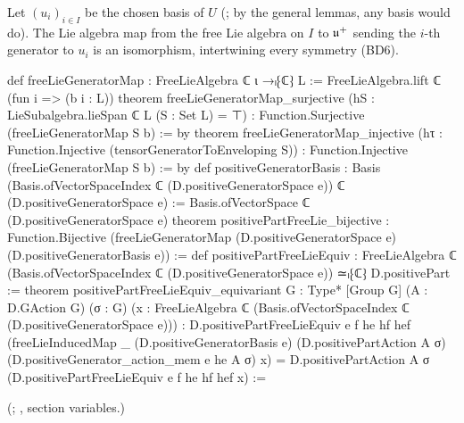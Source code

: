 \begin{theorem}\label{ch18:thm:freelie}
Let $(u_i)_{i\in I}$ be the chosen basis of $U$ (; by the general lemmas, any basis would do).  The Lie
algebra map from the free Lie algebra on $I$ to $\mathfrak{u}^+$ sending the $i$-th generator to $u_i$ is an isomorphism, intertwining every
symmetry (BD6).
\end{theorem}
\begin{leancode}
def freeLieGeneratorMap : FreeLieAlgebra ℂ ι →ₗ⁅ℂ⁆ L :=
  FreeLieAlgebra.lift ℂ (fun i => (b i : L))
theorem freeLieGeneratorMap_surjective (hS : LieSubalgebra.lieSpan ℂ L (S : Set L) = ⊤) :
    Function.Surjective (freeLieGeneratorMap S b) := by
theorem freeLieGeneratorMap_injective
    (hτ : Function.Injective (tensorGeneratorToEnveloping S)) :
    Function.Injective (freeLieGeneratorMap S b) := by
def positiveGeneratorBasis :
    Basis (Basis.ofVectorSpaceIndex ℂ (D.positiveGeneratorSpace e)) ℂ
      (D.positiveGeneratorSpace e) :=
  Basis.ofVectorSpace ℂ (D.positiveGeneratorSpace e)
theorem positivePartFreeLie_bijective :
    Function.Bijective (freeLieGeneratorMap (D.positiveGeneratorSpace e)
      (D.positiveGeneratorBasis e)) :=
def positivePartFreeLieEquiv :
    FreeLieAlgebra ℂ (Basis.ofVectorSpaceIndex ℂ (D.positiveGeneratorSpace e)) ≃ₗ⁅ℂ⁆
      D.positivePart :=
theorem positivePartFreeLieEquiv_equivariant {G : Type*} [Group G] (A : D.GAction G) (σ : G)
    (x : FreeLieAlgebra ℂ (Basis.ofVectorSpaceIndex ℂ (D.positiveGeneratorSpace e))) :
    D.positivePartFreeLieEquiv e f he hf hef
        (freeLieInducedMap _ (D.positiveGeneratorBasis e) (D.positivePartAction A σ)
          (D.positiveGenerator_action_mem e he A σ) x) =
      D.positivePartAction A σ (D.positivePartFreeLieEquiv e f he hf hef x) :=
\end{leancode}
(; ,  section variables.)
